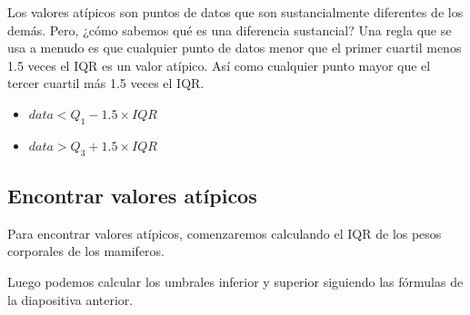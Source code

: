 \documentclass[
  letterpaper,
  DIV=11,
  numbers=noendperiod]{scrreprt}
\newenvironment{Shaded}{\begin{snugshade}}{\end{snugshade}}
\newcommand{\FloatTok}[1]{\textcolor[rgb]{0.68,0.00,0.00}{#1}}
\newcommand{\FunctionTok}[1]{\textcolor[rgb]{0.28,0.35,0.67}{#1}}
\newcommand{\NormalTok}[1]{\textcolor[rgb]{0.00,0.23,0.31}{#1}}
\newcommand{\OtherTok}[1]{\textcolor[rgb]{0.00,0.23,0.31}{#1}}
\newcommand{\SpecialCharTok}[1]{\textcolor[rgb]{0.37,0.37,0.37}{#1}}
\begin{document}
Los valores atípicos son puntos de datos que son sustancialmente
diferentes de los demás. Pero, ¿cómo sabemos qué es una diferencia
sustancial? Una regla que se usa a menudo es que cualquier punto de
datos menor que el primer cuartil menos 1.5 veces el IQR es un valor
atípico. Así como cualquier punto mayor que el tercer cuartil más 1.5
veces el IQR.

\begin{itemize}
\item
  \(data < Q_1 - 1.5\times IQR\)
\item
  \(data > Q_3 + 1.5\times IQR\)
\end{itemize}

\hypertarget{encontrar-valores-atuxedpicos}{%
\subsection{Encontrar valores
atípicos}\label{encontrar-valores-atuxedpicos}}

Para encontrar valores atípicos, comenzaremos calculando el IQR de los
pesos corporales de los mamiferos.

\begin{Shaded}
\end{Shaded}

Luego podemos calcular los umbrales inferior y superior siguiendo las
fórmulas de la diapositiva anterior.

\begin{Shaded}
\end{Shaded}
\end{document}
